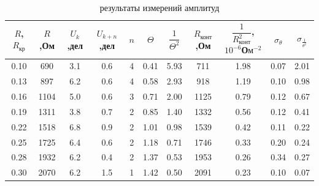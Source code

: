 \documentclass[a4paper,14pt]{article}
\begin{document}
\begin{table}[hbt!]
	\begin{center}
	\begin{tabular}{|c|c|c|c|c|c|c|c|c|c|c|}
		\hline
		$R$, $R_\text{кр}$ & $R$,Ом & $U_k$,дел & $U_{k+n}$,дел & $n$ & $\Theta$ & $\dfrac{1}{\Theta^2}$ & $R_\text{конт}$,Ом & $\dfrac{1}{R_\text{конт}^2}$, $10^{-6}$О$\text{м}^{-2}$ & $\sigma_{\theta}$ & $\sigma_{\frac{1}{\theta^2}}$ \\ \hline
		0.10     & 690   & 3.1       & 0.6         & 4 & 0.41     & 5.93                  & 711        & 1.98                                 & 0.07        & 2.01                             \\ \hline
		0.13     & 897   & 6.2       & 0.6         & 4 & 0.58     & 2.93                  & 918        & 1.19                                 & 0.10        & 0.98                             \\ \hline
		0.16     & 1104  & 5.0       & 0.6         & 3 & 0.71     & 2.00                  & 1125       & 0.79                                 & 0.12        & 0.67                             \\ \hline
		0.19     & 1311  & 3.8       & 0.7         & 2 & 0.85     & 1.40                  & 1332       & 0.56                                 & 0.12        & 0.41                             \\ \hline
		0.22     & 1518  & 6.8       & 0.9         & 2 & 1.01     & 0.98                  & 1539       & 0.42                                 & 0.11        & 0.22                             \\ \hline
		0.25     & 1725  & 6.4       & 0.6         & 2 & 1.18     & 0.71                  & 1746       & 0.33                                 & 0.20        & 0.24                             \\ \hline
		0.28     & 1932  & 6.2       & 0.4         & 2 & 1.37     & 0.53                  & 1953       & 0.26                                 & 0.34        & 0.27                             \\ \hline
		0.30     & 2070  & 6.2       & 1.5         & 1 & 1.42     & 0.50                  & 2091       & 0.23                                 & 0.10        & 0.07                             \\ \hline
	\end{tabular}
\caption{результаты измерений амплитуд}
\label{tab2}
\end{center}
\end{table}
\end{document}
